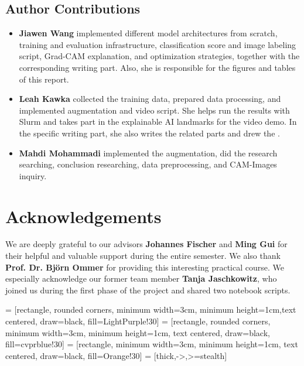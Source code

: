 \subsection*{Author Contributions}
\label{sec:author}

\begin{itemize}
  \item \textbf{Jiawen Wang} implemented different model architectures from scratch, 
  training and evaluation infrastructure, classification score and image labeling script, Grad-CAM explanation, and optimization strategies, 
  together with the corresponding writing part. 
  Also, she is responsible for the figures and tables of this report.
  \item \textbf{Leah Kawka} collected the training data, prepared data processing, and implemented augmentation and video script. 
  She helps run the results with Slurm and takes part in the explainable AI landmarks for the video demo. 
  In the specific writing part, 
  she also writes the related parts and drew the .
  \item \textbf{Mahdi Mohammadi} implemented the augmentation, did the research searching, conclusion researching, data preprocessing, and CAM-Images inquiry.
\end{itemize}

\section*{Acknowledgements}

We are deeply grateful to our advisors \textbf{Johannes Fischer} and \textbf{Ming Gui} for their helpful and valuable support during the entire semester. 
We also thank \textbf{Prof. Dr. Björn Ommer} for providing this interesting practical course. 
We especially acknowledge our former team member \textbf{Tanja Jaschkowitz}, 
who joined us during the first phase of the project and shared two notebook scripts.


 = [rectangle, rounded corners, minimum width=3cm, minimum height=1cm,text centered, draw=black, fill=LightPurple!30]
 = [rectangle, rounded corners, minimum width=3cm, minimum height=1cm, text centered, draw=black, fill=cvprblue!30]
 = [rectangle, minimum width=3cm, minimum height=1cm, text centered, draw=black, fill=Orange!30]
 = [thick,->,>=stealth]

